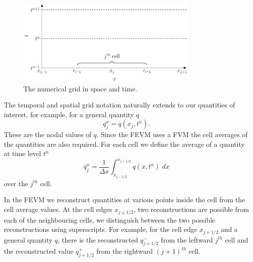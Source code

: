 \begin{figure}
	\centering
	\includegraphics[width=0.8\textwidth]{./chp3/figures/Discretisation.pdf}
	\caption{The numerical grid in space and time.}
	\label{fig:NumericalGrid}
\end{figure}

The temporal and spatial grid notation naturally extends to our quantities of interest, for example, for a general quantity $q$
\begin{equation*}
q^n_j = q(x_j ,t^n). 
\end{equation*}
These are the nodal values of $q$. Since the FEVM uses a FVM the cell averages of the quantities are also required. For each cell we define the average of a quantity at time level $t^n$
\begin{equation*}
\overline{q}_j^n = \frac{1}{\Delta x} \int_{x_{j-1/2}}^{x_{j+1/2}} q(x,t^n) \; dx
\end{equation*}
over the $j^{th}$ cell.

In the FEVM we reconstruct quantities at various points inside the cell from the cell average values. At the cell edges $x_{j\pm1/2}$, two reconstructions are possible from each of the neighbouring cells, we distinguish between the two possible reconstructions using superscripts. For example, for the cell edge $x_{j+1/2}$ and a general quantity $q$, there is the reconstructed $q^-_{j+1/2}$ from the leftward $j^{th}$ cell and the reconstructed value $q^+_{j+1/2}$ from the rightward $(j+1)^{th}$ cell.

